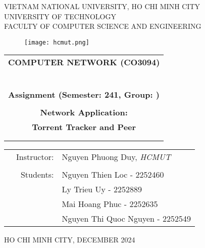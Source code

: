 \documentclass[a4paper]{article}
\begin{document}
\begin{titlepage}
\begin{center}
VIETNAM NATIONAL UNIVERSITY, HO CHI MINH CITY \\
UNIVERSITY OF TECHNOLOGY \\
FACULTY OF COMPUTER SCIENCE AND ENGINEERING
\end{center}

\vspace{1cm}
\begin{figure}[h!]
\begin{center}
     \texttt{[image: hcmut.png]}
\end{center}
\vspace{0.5cm}
\end{figure}

\begin{center}
\begin{tabular}{c}
\\
\multicolumn{1}{l}{\textbf{{\Large COMPUTER NETWORK (CO3094)}}}\\
~~\\
\hline
\\
\multicolumn{1}{l}{\textbf{{\Large Assignment (Semester: 241, Group: )}}}\\
\\
\textbf{{\Huge Network Application: }}\\
\textbf{{\Huge Torrent Tracker and Peer }}\\
\\
\\
\hline
\end{tabular}    
\end{center}
\vspace{0.5 cm}

\begin{table}[h]
\begin{tabular}{rrl}
\hspace{2 cm} 
& \large Instructor: & \large   Nguyen Phuong Duy, \textit{HCMUT}\\
\\
& \large Students: & \large Nguyen Thien Loc  - 2252460\\
&   & \large Ly Trieu Uy - 2252889\\
&   & \large Mai Hoang Phuc - 2252635\\
&   & \large Nguyen Thi Quoc Nguyen - 2252549\\

\end{tabular}
\end{table}
\vspace{4 cm} %
\begin{center}
    \footnotesize{HO CHI MINH CITY, DECEMBER 2024}
\end{center}
\end{titlepage}
\end{document}
